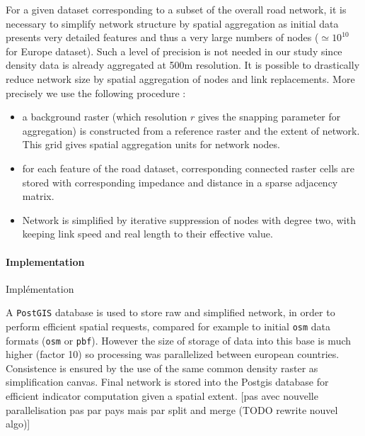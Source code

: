 For a given dataset corresponding to a subset of the overall road network, it is necessary to simplify network structure by spatial aggregation as initial data presents very detailed features and thus a very large numbers of nodes ($\simeq 10^10$ for Europe dataset). 
 Such a level of precision is not needed in our study since density data is already aggregated at 500m resolution. It is possible to drastically reduce network size by spatial aggregation of nodes and link replacements. More precisely we use the following procedure :
\begin{itemize}
\item a background raster (which resolution $r$ gives the snapping parameter for aggregation) is constructed from a reference raster and the extent of network. This grid gives spatial aggregation units for network nodes.
\item for each feature of the road dataset, corresponding connected raster cells are stored with corresponding impedance and distance in a sparse adjacency matrix.
\item Network is simplified by iterative suppression of nodes with degree two, with keeping link speed and real length to their effective value.
\end{itemize}




\paragraph{Implementation}{Implémentation}

A \texttt{PostGIS} database is used to store raw and simplified network, in order to perform efficient spatial requests, compared for example to initial \texttt{osm} data formats (\texttt{osm} or \texttt{pbf}). However the size of storage of data into this base is much higher (factor 10) so processing was parallelized between european countries. Consistence is ensured by the use of the same common density raster as simplification canvas. Final network is stored into the Postgis database for efficient indicator computation given a spatial extent. [pas avec nouvelle parallelisation pas par pays mais par split and merge (TODO rewrite nouvel algo)]



